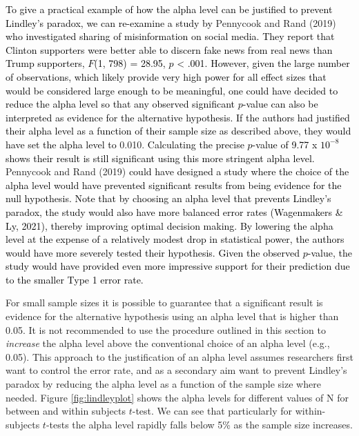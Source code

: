 \documentclass[
  english,
  ,man, a4paper,floatsintext]{apa6}
\begin{document}
\textcolor{black}{To give a practical example of how the alpha level can be justified to prevent Lindley's paradox, we can re-examine a study by} Pennycook and Rand (2019)
\textcolor{black}{who investigated sharing of misinformation on social media. They report that Clinton supporters were better able to discern fake news from real news than Trump supporters, $F$(1, 798) = 28.95, $p$ < .001. However, given the large number of observations, which likely provide very high power for all effect sizes that would be considered large enough to be meaningful, one could have decided to reduce the alpha level so that any observed significant $p$-value can also be interpreted as evidence for the alternative hypothesis. If the authors had justified their alpha level as a function of their sample size as described above, they would have set the alpha level to} 0.010.
\textcolor{black}{Calculating the precise $p$-value of 9.77 x $10^{-8}$ shows their result is still significant using this more stringent alpha level.} Pennycook and Rand (2019) \textcolor{black}{could have designed a study where the choice of the alpha level would have prevented significant results from being evidence for the null hypothesis. Note that by choosing an alpha level that prevents Lindley’s paradox, the study would also have more balanced error rates (Wagenmakers \& Ly, 2021), thereby improving optimal decision making. By lowering the alpha level at the expense of a relatively modest drop in statistical power, the authors would have more severely tested their hypothesis. Given the observed $p$-value, the study would have provided even more impressive support for their prediction due to the smaller Type 1 error rate.}

For small sample sizes it is possible to guarantee that a significant result is evidence for the alternative hypothesis using an alpha level that is higher than 0.05. It is not recommended to use the procedure outlined in this section to \emph{increase} the alpha level above the conventional choice of an alpha level (e.g., 0.05). This approach to the justification of an alpha level assumes researchers first want to control the error rate, and as a secondary aim want to prevent Lindley's paradox by reducing the alpha level as a function of the sample size where needed. Figure \ref{fig:lindleyplot} shows the alpha levels for different values of N for between and within subjects \(t\)-test. We can see that particularly for within-subjects \(t\)-tests the alpha level rapidly falls below 5\% as the sample size increases.
\end{document}
